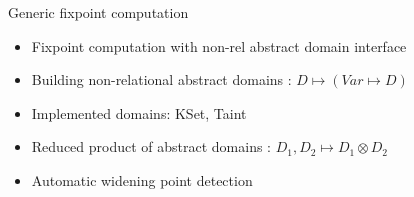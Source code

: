 \begin{frame}{Generic fixpoint computation}
     \begin{itemize}
     \item Fixpoint computation with non-rel abstract domain interface
     \medskip
     \item Building non-relational abstract domains : $D \mapsto (Var \mapsto D)$
     \medskip
     \item Implemented domains: KSet, Taint
     \medskip
     \item Reduced product of abstract domains : $D_1, D_2 \mapsto D_1 \otimes D_2$
     \medskip
     \item Automatic widening point detection%
     \end{itemize}
\end{frame}





